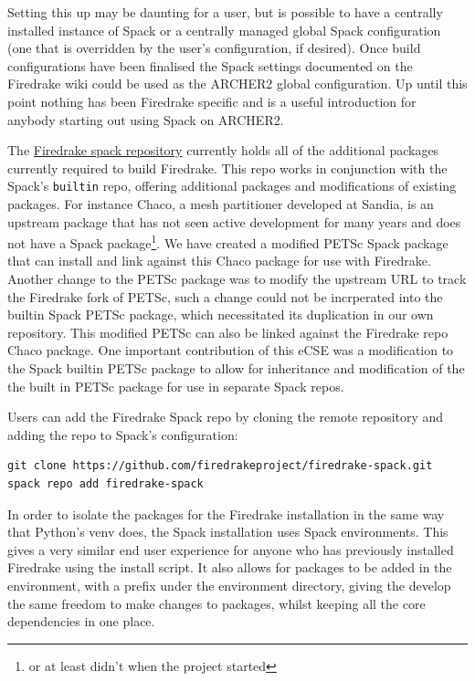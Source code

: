 \documentclass[a4paper,11pt]{article}
\begin{document}
Setting this up may be daunting for a user, but is possible to have a centrally installed instance of Spack or a centrally managed global Spack configuration (one that is overridden by the user's configuration, if desired).
Once build configurations have been finalised the Spack settings documented on the Firedrake wiki could be used as the ARCHER2 global configuration.
Up until this point nothing has been Firedrake specific and is a useful introduction for anybody starting out using Spack on ARCHER2.

The \href{https://github.com/firedrakeproject/firedrake-spack}{Firedrake spack repository} currently holds all of the additional packages currently required to build Firedrake.
This repo works in conjunction with the Spack's \verb`builtin` repo, offering additional packages and modifications of existing packages.
For instance Chaco, a mesh partitioner developed at Sandia, is an upstream package that has not seen active development for many years and does not have a Spack package\footnote{or at least didn't when the project started}.
We have created a modified PETSc Spack package that can install and link against this Chaco package for use with Firedrake.
Another change to the PETSc package was to modify the upstream URL to track the Firedrake fork of PETSc, such a change could not be incrperated into the builtin Spack PETSc package, which necessitated its duplication in our own repository.
This modified PETSc can also be linked against the Firedrake repo Chaco package.
One important contribution of this eCSE was a modification to the Spack builtin PETSc package to allow for inheritance and modification of the the built in PETSc package for use in separate Spack repos.

Users can add the Firedrake Spack repo by cloning the remote repository and adding the repo to Spack's configuration:
\begin{lstlisting}
git clone https://github.com/firedrakeproject/firedrake-spack.git
spack repo add firedrake-spack
\end{lstlisting}

In order to isolate the packages for the Firedrake installation in the same way that Python's venv does, the Spack installation uses Spack environments.
This gives a very similar end user experience for anyone who has previously installed Firedrake using the install script.
It also allows for packages to be added in the environment, with a prefix under the environment directory, giving the develop the same freedom to make changes to packages, whilst keeping all the core dependencies in one place.
\end{document}
